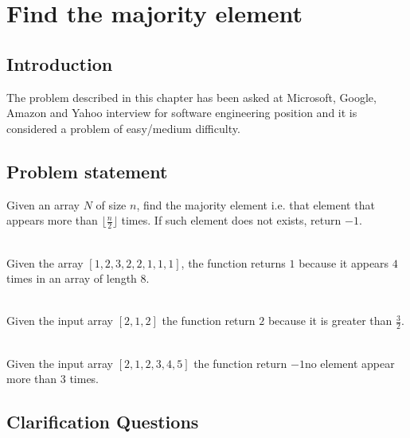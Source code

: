 %

\chapter{Find the majority element}
\label{ch:majority_element}
\section*{Introduction}
The problem described in this chapter has been asked at Microsoft, Google, Amazon and Yahoo interview for software engineering position and it is considered a problem of easy/medium difficulty.

\section{Problem statement}
\begin{exercise}
Given an array $N$ of size $n$, find the majority element i.e. that element that appears more than $\lfloor \frac{n}{2} \rfloor$ times.
If such element does not exists, return $-1$.
	\begin{example}
		\hfill \\
		Given the array $[1,2,3,2,2,1,1,1]$, the function returns $1$ because it appears $4$ times in an array of length $8$.
	
	\end{example}

	\begin{example}
		\hfill \\
		Given the input array $[2, 1, 2]$ the function return $2$ because it is greater than $\frac{3}{2}$.
		
	\end{example}

	\begin{example}
		\hfill \\
		Given the input array $[2, 1, 2,3,4,5]$ the function return $-1$no element appear more than $3$ times.
		
	\end{example}

\end{exercise}

\section{Clarification Questions}

